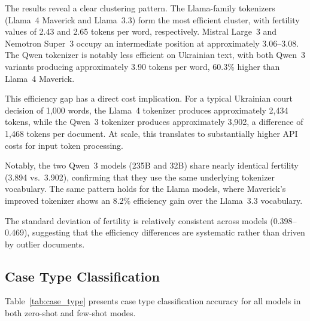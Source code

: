 \documentclass[11pt,a4paper]{article}
\begin{document}

The results reveal a clear clustering pattern. The Llama-family tokenizers (Llama~4 Maverick and Llama~3.3) form the most efficient cluster, with fertility values of 2.43 and 2.65 tokens per word, respectively. Mistral Large~3 and Nemotron Super~3 occupy an intermediate position at approximately 3.06--3.08. The Qwen tokenizer is notably less efficient on Ukrainian text, with both Qwen~3 variants producing approximately 3.90 tokens per word, 60.3\% higher than Llama~4 Maverick.

This efficiency gap has a direct cost implication. For a typical Ukrainian court decision of 1,000 words, the Llama~4 tokenizer produces approximately 2,434 tokens, while the Qwen~3 tokenizer produces approximately 3,902, a difference of 1,468 tokens per document. At scale, this translates to substantially higher API costs for input token processing.

Notably, the two Qwen~3 models (235B and 32B) share nearly identical fertility (3.894 vs.\ 3.902), confirming that they use the same underlying tokenizer vocabulary. The same pattern holds for the Llama models, where Maverick's improved tokenizer shows an 8.2\% efficiency gain over the Llama~3.3 vocabulary.

The standard deviation of fertility is relatively consistent across models (0.398--0.469), suggesting that the efficiency differences are systematic rather than driven by outlier documents.

\subsection{Case Type Classification}
\label{sec:results_casetype}

Table~\ref{tab:case_type} presents case type classification accuracy for all models in both zero-shot and few-shot modes.
\end{document}
